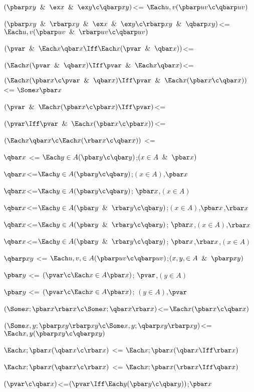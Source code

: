 $(\pbarp xy\And\ex x\And\ex y \c \qbarp xy)$<= $\Each u,v (\pbarp uv \c \qbarp uv)$ 

$(\pbarp xy\And \rbarp xy \And\ex x\And\ex y \c \rbarp xy \And \qbarp xy)$<= $\Each u,v (\pbarp uv \And \rbarp uv\c \qbarp uv)$ 

$(\pvar\And\Each x \qbar x \Iff \Each x(\pvar \And \qbar x))$<=

$(\Each x(\pvar \And \qbar x)\Iff \pvar\And\Each x \qbar x )$<=

$(\Each x (\pbar x \c \pvar \And \qbar x) \Iff \pvar \And \Each x (\pbar x \c \qbar x))$ <= $\Some x \pbar x$

$(\pvar \And \Each x (\pbar x \c \pbar x)\Iff \pvar)$<=

$(\pvar \Iff \pvar \And \Each x (\pbar x \c \pbar x))$<=

$(\Each x \qbar x \c \Each x (\rbar x \c \qbar x)) $ <= 

$\qbar x$ <= $\Each y \in A(\pbar y \c \qbar y)$;$(x \in A\And\pbar x)$

$\qbar x$<=$\Each y\in A(\pbar y \c \qbar y)$;$(x \in A)$,$\pbar x$

$\qbar x$<=$\Each y\in A(\pbar y \c \qbar y)$; $\pbar x$,$(x \in A)$

$\qbar x$<=$\Each y\in A(\pbar y \And \rbar y\c \qbar y)$;$(x \in A)$,$\pbar x$,$\rbar x$

$\qbar x$<=$\Each y\in A(\pbar y \And \rbar y\c \qbar y)$; $\pbar x$,$(x \in A)$,$\rbar x$

$\qbar x$<=$\Each y\in A(\pbar y \And \rbar y\c \qbar y)$; $\pbar x$,$\rbar x$,$(x \in A)$

$\qbarp xy$ <= $\Each u,v,\in A(\pbarp uv \c \qbarp uv)$;$(x,y,\in A \And \pbarp xy)$

$\pbar y$ <= $(\pvar \c \Each x \in A \pbar x)$; $\pvar$,$(y \in A)$

$\pbar y$ <= $(\pvar \c \Each x \in A \pbar x)$; $(y \in A)$,$\pvar$

$(\Some x; \pbar x \rbar x \c \Some x;\qbar x \rbar x)$<=$\Each x(\pbar x \c \qbar x)$

$(\Some x,y; \pbarp xy \rbarp xy \c \Some x,y;\qbarp xy \rbarp xy)$<=$\Each x,y(\pbarp xy \c \qbarp xy)$

$\Each x ; \pbar x(\qbar x \c \rbar x)$ <= $\Each x ; \pbar x (\qbar x \Iff \rbar x)$

$\Each x ; \pbar x(\qbar x \c \rbar x)$ <= $\Each x ; \pbar x (\rbar x \Iff \qbar x)$

$(\pvar \c\qbar x )$<=$(\pvar \Iff \Each y(\pbar y \c \qbar y))$;$\pbar x$


